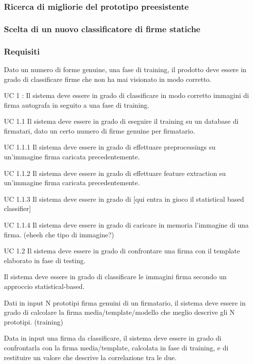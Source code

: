 \subsubsection{Ricerca di migliorie del prototipo preesistente}
\label{3.2.1}

\subsubsection{Scelta di un nuovo classificatore di firme statiche}
\label{3.2.2}

\subsubsection{Requisiti}
\label{3.2.3}
Dato un numero di forme genuine, una fase di training, il prodotto deve essere in grado di classificare firme che non ha mai visionato in modo corretto.

UC 1 : Il sistema deve essere in grado di classificare in modo corretto immagini di firma autografa in seguito a una fase di training.

UC 1.1 Il sistema deve essere in grado di eseguire il training su un database di firmatari, dato un certo numero di firme genuine per firmatario.

UC 1.1.1 Il sistema deve essere in grado di effettuare preprocessings su un'immagine firma caricata precedentemente.

UC 1.1.2 Il sistema deve essere in grado di effettuare feature extraction su un'immagine firma caricata precedentemente.

UC 1.1.3 Il sistema deve essere in grado di [qui entra in gioco il statistical based classifier] 

UC 1.1.4 Il sistema deve essere in grado di caricare in memoria l'immagine di una firma. (eheeh che tipo di immagine?)

UC 1.2 Il sistema deve essere in grado di confrontare una firma con il template elaborato in fase di testing.



Il sistema deve essere in grado di classificare le immagini firma secondo un approccio statistical-based.

Dati in input N prototipi firma genuini di un firmatario, il sistema deve essere in grado di calcolare la firma media/template/modello che meglio descrive gli N prototipi. (training)

Data in input una firma da classificare, il sistema deve essere in grado di confrontarla con la firma media/template, calcolata in fase di training, e di restituire un valore che descrive la correlazione tra le due.

